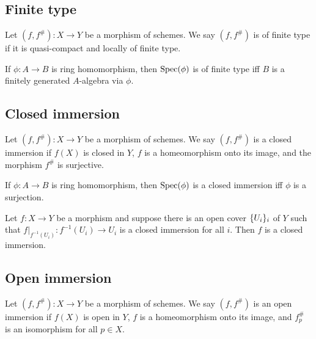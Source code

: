 \documentclass{memoir}
\begin{document}
\subsection{Finite type}
\begin{definition}
    Let $(f,f^\#):X\to Y$ be a morphism of schemes.
    We say $(f,f^\#)$ is of finite type if it is quasi-compact and locally of finite type.
\end{definition}
\begin{remark}
    If $\phi:A\to B$ is ring homomorphism, then $\operatorname{Spec}(\phi)$ is of finite type iff $B$ is a finitely generated $A$-algebra via $\phi$.
\end{remark}
\subsection{Closed immersion}
\begin{definition}
    Let $(f,f^\#):X\to Y$ be a morphism of schemes.
    We say $(f,f^\#)$ is a closed immersion if $f(X)$ is closed in $Y$, $f$ is a homeomorphism onto its image, and the morphism $f^\#$ is surjective.
\end{definition}
\begin{remark}
    If $\phi:A\to B$ is ring homomorphism, then $\operatorname{Spec}(\phi)$ is a closed immersion iff $\phi$ is a surjection.
\end{remark}
\begin{proposition}
    Let $f:X\to Y$ be a morphism and suppose there is an open cover $\lbrace U_i\rbrace_i$ of $Y$ such that $f|_{f^{-1}(U_i)}:f^{-1}(U_i)\to U_i$ is a closed immersion for all $i$.
    Then $f$ is a closed immersion.
\end{proposition}
\subsection{Open immersion}
\begin{definition}
    Let $(f,f^\#):X\to Y$ be a morphism of schemes.
    We say $(f,f^\#)$ is an open immersion if $f(X)$ is open in $Y$, $f$ is a homeomorphism onto its image, and $f_p^\#$ is an isomorphism for all $p\in X$.
\end{definition}
\end{document}
